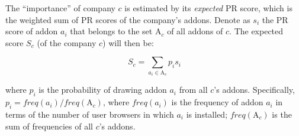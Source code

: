 \documentclass[10pt,letterpaper]{article}
\begin{document}
The ``importance'' of company $c$ is estimated by its \textit{expected} PR score, which is the weighted sum of PR scores of the company's addons. Denote as $s_i$ the PR score of addon $a_i$ that belongs to the set ${\boldsymbol{\mathrm{A}}}_c$ of all addons of $c$. The expected score $S_c$ (of the company $c$) will then be: 

\begin{equation} \label{GrindEQ__6_} 
S_c = \sum_{a_i \in {\boldsymbol{\mathrm{A}}}_c} p_i s_i 
\end{equation} 

\noindent where $p_i$ is the probability of drawing addon $a_i$ from all $c$'s addons. Specifically, $p_i = freq(a_i) / freq({\boldsymbol{\mathrm{A}}}_c)$, where $freq(a_i)$ is the frequency of addon $a_i$ in terms of the number of user browsers in which $a_i$ is installed; $freq({\boldsymbol{\mathrm{A}}}_c)$ is the sum of frequencies of all $c$'s addons.
\end{document}
